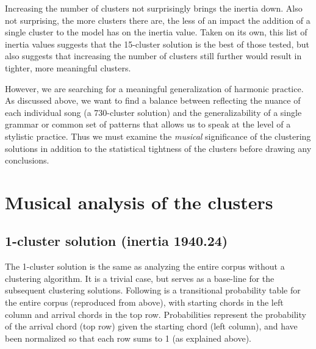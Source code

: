 Increasing the number of clusters not surprisingly brings the inertia down. Also not surprising, the more clusters there are, the less of an impact the addition of a single cluster to the model has on the inertia value. Taken on its own, this list of inertia values suggests that the 15-cluster solution is the best of those tested, but also suggests that increasing the number of clusters still further would result in tighter, more meaningful clusters.

However, we are searching for a meaningful generalization of harmonic practice. As discussed above, we want to find a balance between reflecting the nuance of each individual song (a 730-cluster solution) and the generalizability of a single grammar or common set of patterns that allows us to speak at the level of a stylistic practice. Thus we must examine the \emph{musical} significance of the clustering solutions in addition to the statistical tightness of the clusters before drawing any conclusions.

\section{Musical analysis of the clusters}
\label{musicalanalysisoftheclusters}

\subsection{1-cluster solution (inertia 1940.24)}
\label{1-clustersolutioninertia1940.24}

The 1-cluster solution is the same as analyzing the entire corpus without a clustering algorithm. It is a trivial case, but serves as a base-line for the subsequent clustering solutions. Following is a transitional probability table for the entire corpus (reproduced from above), with starting chords in the left column and arrival chords in the top row. Probabilities represent the probability of the arrival chord (top row) given the starting chord (left column), and have been normalized so that each row sums to 1 (as explained above).

